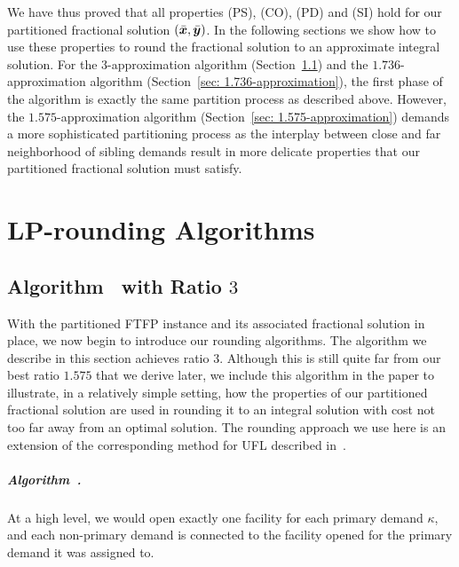 \documentclass[oneside,final]{ucr}
\begin{document}
We have thus proved that all properties (PS), (CO), (PD) and (SI) hold
for our partitioned fractional solution $(\bar{\boldsymbol{x}},\bar{\boldsymbol{y}})$. In the
following sections we show how to use these properties to round the
fractional solution to an approximate integral solution. For the
$3$-approximation algorithm (Section~\ref{sec: 3-approximation}) and
the $1.736$-approximation algorithm (Section~\ref{sec:
  1.736-approximation}), the first phase of the algorithm is exactly
the same partition process as described above. However, the
$1.575$-approximation algorithm (Section~\ref{sec:
  1.575-approximation}) demands a more sophisticated partitioning
process as the interplay between close and far neighborhood of sibling
demands result in more delicate properties that our partitioned
fractional solution must satisfy.

\chapter{LP-rounding Algorithms} \label{ch: lp-rounding}

\section{Algorithm~{\EGUP} with Ratio $3$}
\label{sec: 3-approximation}

With the partitioned FTFP instance and its associated fractional
solution in place, we now begin to introduce our rounding algorithms.
The algorithm we describe in this section achieves ratio $3$. Although
this is still quite far from our best ratio $1.575$ that we derive
later, we include this algorithm in the paper to illustrate, in a
relatively simple setting, how the properties of our partitioned
fractional solution are used in rounding it to an integral solution
with cost not too far away from an optimal solution.  The rounding
approach we use here is an extension of the corresponding method for
UFL described in~\cite{gupta08}.

\paragraph{Algorithm~{\EGUP.}}
At a high level, we would open exactly one facility for each
primary demand $\kappa$, and each non-primary demand is
connected to the facility opened for the primary demand it
was assigned to.
\end{document}
